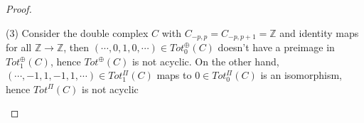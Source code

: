 \documentclass[../main.tex]{subfiles}
\begin{document}
\begin{proof}
\begin{center}
\end{center}
(3) Consider the double complex $C$ with $C_{-p,p}=C_{-p,p+1}=\mathbb Z$ and identity maps for all $\mathbb Z\to\mathbb Z$, then $(\cdots,0,1,0,\cdots)\in Tot^\oplus_0(C)$ doesn't have a preimage in $Tot^\oplus_1(C)$, hence $Tot^\oplus(C)$ is not acyclic. On the other hand, $(\cdots,-1,1,-1,1,\cdots)\in Tot^\Pi_1(C) $ maps to $0\in Tot^\Pi_0(C)$ is an isomorphism, hence $Tot^\Pi(C)$ is not acyclic
\begin{center}
\end{center}
\end{proof}
\end{document}
